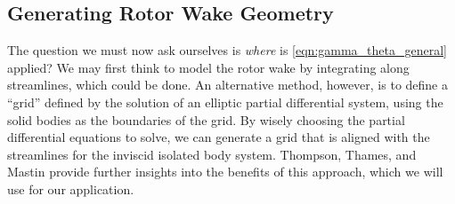 %



\subsection{Generating Rotor Wake Geometry}
\label{sec:rotorwakegeometry}

The question we must now ask ourselves is \textit{where} is \cref{eqn:gamma_theta_general} applied?
%
We may first think to model the rotor wake by integrating along streamlines, which could be done.
%
An alternative method, however, is to define a ``grid'' defined by the solution of an elliptic partial differential system, using the solid bodies as the boundaries of the grid.
%
By wisely choosing the partial differential equations to solve, we can generate a grid that is aligned with the streamlines for the inviscid isolated body system.
%
Thompson, Thames, and Mastin provide further insights into the benefits of this approach, which we will use for our application.

\begin{assumption}




\end{assumption}

